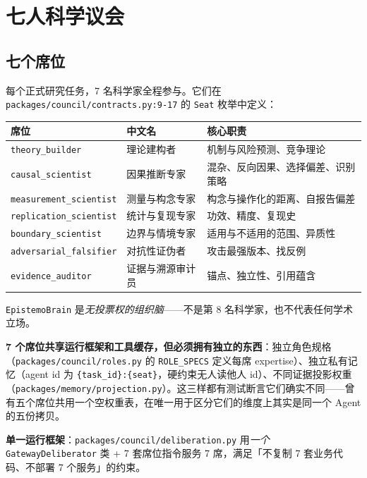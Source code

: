 \section{七人科学议会}

\subsection{七个席位}

每个正式研究任务，7 名科学家全程参与。它们在 \texttt{packages/council/contracts.py:9-17} 的 \texttt{Seat} 枚举中定义：

\begin{table}[h]
\centering
\small
\begin{tabular}{@{}lll@{}}
\toprule
\textbf{席位} & \textbf{中文名} & \textbf{核心职责} \\
\midrule
\texttt{theory\_builder} & 理论建构者 & 机制与风险预测、竞争理论 \\
\texttt{causal\_scientist} & 因果推断专家 & 混杂、反向因果、选择偏差、识别策略 \\
\texttt{measurement\_scientist} & 测量与构念专家 & 构念与操作化的距离、自报告偏差 \\
\texttt{replication\_scientist} & 统计与复现专家 & 功效、精度、复现史 \\
\texttt{boundary\_scientist} & 边界与情境专家 & 适用与不适用的范围、异质性 \\
\texttt{adversarial\_falsifier} & 对抗性证伪者 & 攻击最强版本、找反例 \\
\texttt{evidence\_auditor} & 证据与溯源审计员 & 锚点、独立性、引用蕴含 \\
\bottomrule
\end{tabular}
\end{table}

\texttt{EpistemoBrain} 是\emph{无投票权的组织脑}——不是第 8 名科学家，也不代表任何学术立场。

\textbf{7 个席位共享运行框架和工具缓存，但必须拥有独立的东西}：独立角色规格（\texttt{packages/council/roles.py} 的 \texttt{ROLE\_SPECS} 定义每席 expertise）、独立私有记忆（agent id 为 \texttt{\{task\_id\}:\{seat\}}，硬约束无人读他人 id）、不同证据投影权重（\texttt{packages/memory/projection.py}）。这三样都有测试断言它们确实不同——曾有五个席位共用一个空权重表，在唯一用于区分它们的维度上其实是同一个 Agent 的五份拷贝。

\textbf{单一运行框架}：\texttt{packages/council/deliberation.py} 用\emph{一个} \texttt{GatewayDeliberator} 类 + 7 套席位指令服务 7 席，满足「不复制 7 套业务代码、不部署 7 个服务」的约束。

